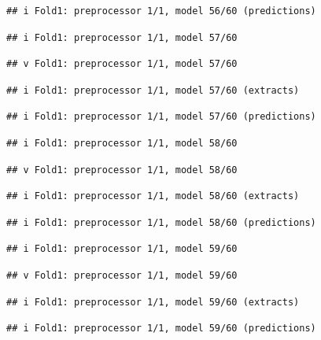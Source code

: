 \documentclass[
]{article}
\begin{document}
\begin{verbatim}
## i Fold1: preprocessor 1/1, model 56/60 (predictions)
\end{verbatim}

\begin{verbatim}
## i Fold1: preprocessor 1/1, model 57/60
\end{verbatim}

\begin{verbatim}
## v Fold1: preprocessor 1/1, model 57/60
\end{verbatim}

\begin{verbatim}
## i Fold1: preprocessor 1/1, model 57/60 (extracts)
\end{verbatim}

\begin{verbatim}
## i Fold1: preprocessor 1/1, model 57/60 (predictions)
\end{verbatim}

\begin{verbatim}
## i Fold1: preprocessor 1/1, model 58/60
\end{verbatim}

\begin{verbatim}
## v Fold1: preprocessor 1/1, model 58/60
\end{verbatim}

\begin{verbatim}
## i Fold1: preprocessor 1/1, model 58/60 (extracts)
\end{verbatim}

\begin{verbatim}
## i Fold1: preprocessor 1/1, model 58/60 (predictions)
\end{verbatim}

\begin{verbatim}
## i Fold1: preprocessor 1/1, model 59/60
\end{verbatim}

\begin{verbatim}
## v Fold1: preprocessor 1/1, model 59/60
\end{verbatim}

\begin{verbatim}
## i Fold1: preprocessor 1/1, model 59/60 (extracts)
\end{verbatim}

\begin{verbatim}
## i Fold1: preprocessor 1/1, model 59/60 (predictions)
\end{verbatim}
\end{document}
